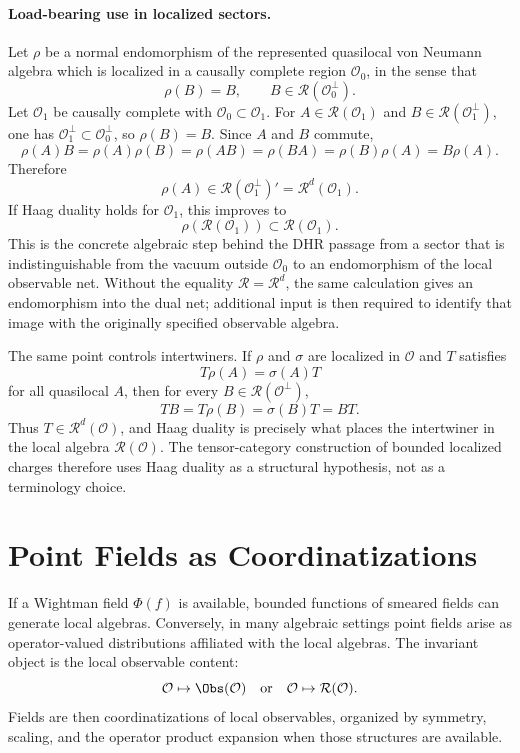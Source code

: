 \paragraph{Load-bearing use in localized sectors.}
Let \(\rho\) be a normal endomorphism of the represented quasilocal von
Neumann algebra which is localized in a causally complete region
\(\mathcal O_0\), in the sense that
\[
  \rho(B)=B,\qquad B\in\mathcal R(\mathcal O_0^\perp).
\]
Let \(\mathcal O_1\) be causally complete with
\(\mathcal O_0\subset\mathcal O_1\).  For
\(A\in\mathcal R(\mathcal O_1)\) and
\(B\in\mathcal R(\mathcal O_1^\perp)\), one has
\(\mathcal O_1^\perp\subset\mathcal O_0^\perp\), so \(\rho(B)=B\).  Since
\(A\) and \(B\) commute,
\[
  \rho(A)B
  =
  \rho(A)\rho(B)
  =
  \rho(AB)
  =
  \rho(BA)
  =
  \rho(B)\rho(A)
  =
  B\rho(A).
\]
Therefore
\[
  \rho(A)\in\mathcal R(\mathcal O_1^\perp)'
  =
  \mathcal R^d(\mathcal O_1).
\]
If Haag duality holds for \(\mathcal O_1\), this improves to
\[
  \rho(\mathcal R(\mathcal O_1))\subset\mathcal R(\mathcal O_1).
\]
This is the concrete algebraic step behind the DHR passage from a sector that
is indistinguishable from the vacuum outside \(\mathcal O_0\) to an
endomorphism of the local observable net.  Without the equality
\(\mathcal R=\mathcal R^d\), the same calculation gives an endomorphism into
the dual net; additional input is then required to identify that image with
the originally specified observable algebra.

The same point controls intertwiners.  If \(\rho\) and \(\sigma\) are
localized in \(\mathcal O\) and \(T\) satisfies
\[
  T\rho(A)=\sigma(A)T
\]
for all quasilocal \(A\), then for every
\(B\in\mathcal R(\mathcal O^\perp)\),
\[
  TB=T\rho(B)=\sigma(B)T=BT.
\]
Thus \(T\in\mathcal R^d(\mathcal O)\), and Haag duality is precisely what
places the intertwiner in the local algebra \(\mathcal R(\mathcal O)\).  The
tensor-category construction of bounded localized charges therefore uses
Haag duality as a structural hypothesis, not as a terminology choice.

\section{Point Fields as Coordinatizations}

If a Wightman field \(\Phi(f)\) is available, bounded functions of smeared
fields can generate local algebras.  Conversely, in many algebraic settings
point fields arise as operator-valued distributions affiliated with the local
algebras.  The invariant object is the local observable content:
\[
  \mathcal O\mapsto \Obs(\mathcal O)
  \quad\text{or}\quad
  \mathcal O\mapsto\mathcal R(\mathcal O).
\]
Fields are then coordinatizations of local observables, organized by symmetry,
scaling, and the operator product expansion when those structures are
available.

